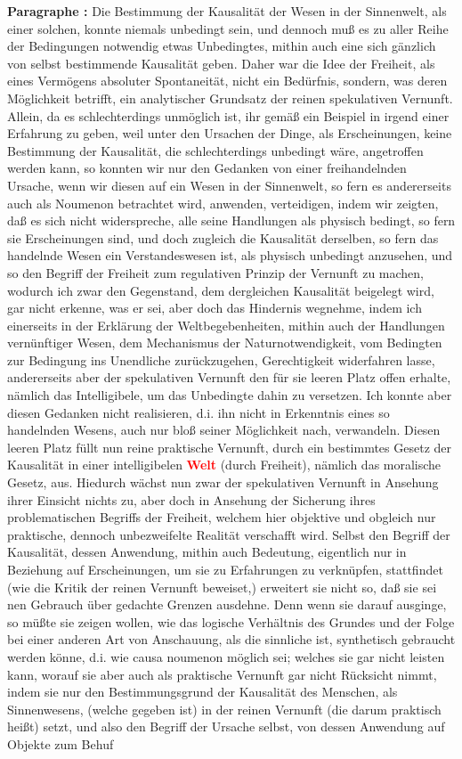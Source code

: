 \documentclass[a4paper,12pt,twoside]{book}
\newcommand{\match}[1]{\textcolor{red}{\textbf{#1}}}
\begin{document}
	\noindent\textbf{Paragraphe : }
	Die Bestimmung der Kausalität der Wesen in der Sinnenwelt, als einer solchen, konnte niemals unbedingt sein, und dennoch muß es zu aller Reihe der Bedingungen notwendig etwas Unbedingtes, mithin auch eine sich gänzlich von selbst bestimmende Kausalität geben. Daher war die Idee der Freiheit, als eines Vermögens absoluter Spontaneität, nicht ein Bedürfnis, sondern, was deren Möglichkeit betrifft, ein analytischer Grundsatz der reinen spekulativen Vernunft. Allein, da es schlechterdings unmöglich ist, ihr gemäß ein Beispiel in irgend einer Erfahrung zu geben, weil unter den Ursachen der Dinge, als Erscheinungen, keine Bestimmung der Kausalität, die schlechterdings unbedingt wäre, angetroffen werden kann, so konnten wir nur den Gedanken von einer freihandelnden Ursache, wenn wir diesen auf ein Wesen in der Sinnenwelt, so fern es andererseits auch als Noumenon betrachtet wird, anwenden, verteidigen, indem wir zeigten, daß es sich nicht widerspreche, alle seine Handlungen als physisch bedingt, so fern sie Erscheinungen sind, und doch zugleich die Kausalität derselben, so fern das handelnde Wesen ein Verstandeswesen ist, als physisch unbedingt anzusehen, und so den Begriff der Freiheit zum regulativen Prinzip der Vernunft zu machen, wodurch ich zwar den Gegenstand, dem dergleichen Kausalität beigelegt wird, gar nicht erkenne, was er sei, aber doch das Hindernis wegnehme, indem ich einerseits in der Erklärung der Weltbegebenheiten, mithin auch der Handlungen vernünftiger Wesen, dem Mechanismus der Naturnotwendigkeit, vom Bedingten zur Bedingung ins Unendliche zurückzugehen, Gerechtigkeit widerfahren lasse, andererseits aber der spekulativen Vernunft den für sie leeren Platz offen erhalte, nämlich das Intelligibele, um das Unbedingte dahin zu versetzen. Ich konnte aber diesen Gedanken nicht realisieren, d.i. ihn nicht in Erkenntnis eines so handelnden Wesens, auch nur bloß seiner Möglichkeit nach, verwandeln. Diesen leeren Platz füllt nun reine praktische Vernunft, durch ein bestimmtes Gesetz der Kausalität in einer intelligibelen \match{Welt} (durch Freiheit), nämlich das moralische Gesetz, aus. Hiedurch wächst nun zwar der  spekulativen Vernunft in Ansehung ihrer Einsicht nichts zu, aber doch in Ansehung der Sicherung ihres problematischen Begriffs der Freiheit, welchem hier objektive und obgleich nur praktische, dennoch unbezweifelte Realität verschafft wird. Selbst den Begriff der Kausalität, dessen Anwendung, mithin auch Bedeutung, eigentlich nur in Beziehung auf Erscheinungen, um sie zu Erfahrungen zu verknüpfen, stattfindet (wie die Kritik der reinen Vernunft beweiset,) erweitert sie nicht so, daß sie sei nen Gebrauch über gedachte Grenzen ausdehne. Denn wenn sie darauf ausginge, so müßte sie zeigen wollen, wie das logische Verhältnis des Grundes und der Folge bei einer anderen Art von Anschauung, als die sinnliche ist, synthetisch gebraucht werden könne, d.i. wie causa noumenon möglich sei; welches sie gar nicht leisten kann, worauf sie aber auch als praktische Vernunft gar nicht Rücksicht nimmt, indem sie nur den Bestimmungsgrund der Kausalität des Menschen, als Sinnenwesens, (welche gegeben ist) in der reinen Vernunft (die darum praktisch heißt) setzt, und also den Begriff der Ursache selbst, von dessen Anwendung auf Objekte zum Behuf 
\end{document}
